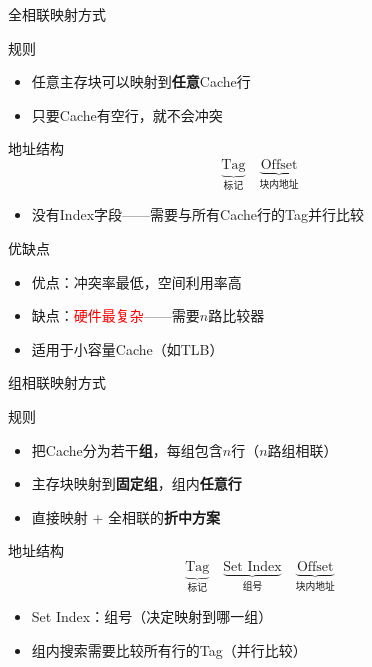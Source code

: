 \documentclass[10pt, aspectratio=169]{beamer}
\begin{document}
\begin{frame}[t]{全相联映射方式}
    \begin{block}{规则}
        \begin{itemize}
            \item 任意主存块可以映射到\textbf{任意}Cache行
            \item 只要Cache有空行，就不会冲突
        \end{itemize}
    \end{block}
    \vspace{0.3em}
    \begin{block}{地址结构}
        \[
            \underbrace{\text{Tag}}_{\text{标记}} \quad
            \underbrace{\text{Offset}}_{\text{块内地址}}
        \]
        \begin{itemize}
            \item 没有Index字段——需要与所有Cache行的Tag并行比较
        \end{itemize}
    \end{block}
    \vspace{0.3em}
    \begin{block}{优缺点}
        \begin{itemize}
            \item 优点：冲突率最低，空间利用率高
            \item 缺点：\textcolor{red}{硬件最复杂}——需要$n$路比较器
            \item 适用于小容量Cache（如TLB）
        \end{itemize}
    \end{block}
\end{frame}

\begin{frame}{组相联映射方式}
    \begin{block}{规则}
        \begin{itemize}
            \item 把Cache分为若干\textbf{组}，每组包含$n$行（$n$路组相联）
            \item 主存块映射到\textbf{固定组}，组内\textbf{任意行}
            \item 直接映射 + 全相联的\textbf{折中方案}
        \end{itemize}
    \end{block}
    \vspace{0.3em}
    \begin{block}{地址结构}
        \[
            \underbrace{\text{Tag}}_{\text{标记}} \quad
            \underbrace{\text{Set Index}}_{\text{组号}} \quad
            \underbrace{\text{Offset}}_{\text{块内地址}}
        \]
        \begin{itemize}
            \item Set Index：组号（决定映射到哪一组）
            \item 组内搜索需要比较所有行的Tag（并行比较）
        \end{itemize}
    \end{block}
\end{frame}
\end{document}
